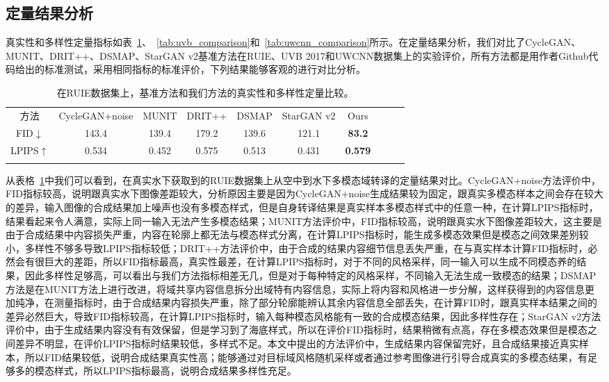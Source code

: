 \subsection{定量结果分析}

真实性和多样性定量指标如表~\ref{tab:ruie_comparison}、~\ref{tab:uvb_comparison}和~\ref{tab:uwcnn_comparison}所示。在定量结果分析，我们对比了CycleGAN、MUNIT、DRIT++、DSMAP、StarGAN v2基准方法在RUIE、UVB 2017和UWCNN数据集上的实验评价，所有方法都是用作者Github代码给出的标准测试，采用相同指标的标准评价，下列结果能够客观的进行对比分析。

\begin{table}[ht]
\centering
\caption{在RUIE数据集上，基准方法和我们方法的真实性和多样性定量比较。}
  \begin{tabular}{c|ccccccccc}
    \hline\noalign{\smallskip}
    方法 & CycleGAN+noise & MUNIT & DRIT++ & DSMAP & StarGAN v2 & Ours \\
    \noalign{\smallskip}\hline\noalign{\smallskip}
    FID$\downarrow$ & 143.4 & 139.4 & 179.2 & 139.6 & 121.1 & \textbf{83.2} \\
    LPIPS$\uparrow$ & 0.534 & 0.452 & 0.575 & 0.513 & 0.431 & \textbf{0.579} \\
    \noalign{\smallskip}\hline
  \end{tabular}
  \label{tab:ruie_comparison}
\end{table}

从表格~\ref{tab:ruie_comparison}中我们可以看到，在真实水下获取到的RUIE数据集上从空中到水下多模态域转译的定量结果对比。CycleGAN+noise方法评价中，FID指标较高，说明跟真实水下图像差距较大，分析原因主要是因为CycleGAN+noise生成结果较为固定，跟真实多模态样本之间会存在较大的差异，输入图像的合成结果加上噪声也没有多模态样式，但是自身转译结果是真实样本多模态样式中的任意一种，在计算LPIPS指标时，结果看起来令人满意，实际上同一输入无法产生多模态结果；MUNIT方法评价中，FID指标较高，说明跟真实水下图像差距较大，这主要是由于合成结果中内容损失严重，内容在轮廓上都无法与模态样式分离，在计算LPIPS指标时，能生成多模态效果但是模态之间效果差别较小，多样性不够多导致LPIPS指标较低；DRIT++方法评价中，由于合成的结果内容细节信息丢失严重，在与真实样本计算FID指标时，必然会有很巨大的差距，所以FID指标最高，真实性最差，在计算LPIPS指标时，对于不同的风格采样，同一输入可以生成不同模态养的结果，因此多样性足够高，可以看出与我们方法指标相差无几，但是对于每种特定的风格采样，不同输入无法生成一致模态的结果；DSMAP方法是在MUNIT方法上进行改进，将域共享内容信息拆分出域特有内容信息，实际上将内容和风格进一步分解，这样获得到的内容信息更加纯净，在测量指标时，由于合成结果内容损失严重，除了部分轮廓能辨认其余内容信息全部丢失，在计算FID时，跟真实样本结果之间的差异必然巨大，导致FID指标较高，在计算LPIPS指标时，输入每种模态风格能有一致的合成模态结果，因此多样性存在；StarGAN v2方法评价中，由于生成结果内容没有有效保留，但是学习到了海底样式，所以在评价FID指标时，结果稍微有点高，存在多模态效果但是模态之间差异不明显，在评价LPIPS指标时结果较低，多样式不足。本文中提出的方法评价中，生成结果内容保留完好，且合成结果接近真实样本，所以FID结果较低，说明合成结果真实性高；能够通过对目标域风格随机采样或者通过参考图像进行引导合成真实的多模态结果，有足够多的模态样式，所以LPIPS指标最高，说明合成结果多样性充足。

